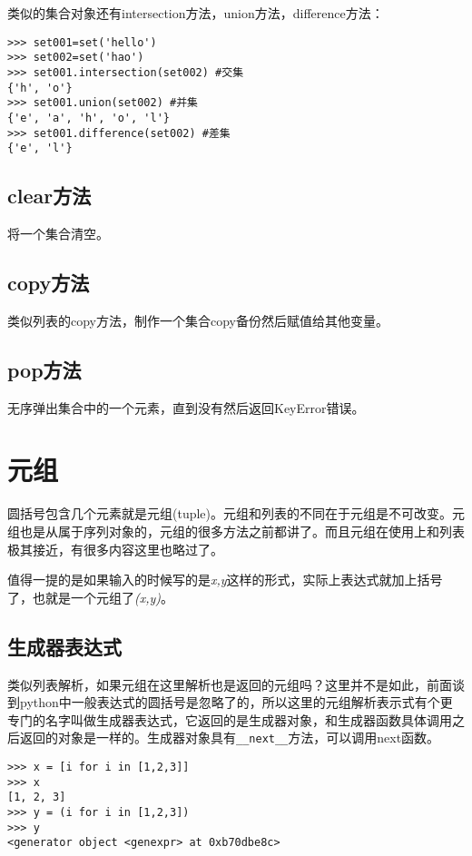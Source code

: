\documentclass[12pt,oneside]{book}
\begin{document}
\begin{common-format}
类似的集合对象还有intersection方法，union方法，difference方法：
\begin{Verbatim}
>>> set001=set('hello')
>>> set002=set('hao')
>>> set001.intersection(set002) #交集
{'h', 'o'}
>>> set001.union(set002) #并集
{'e', 'a', 'h', 'o', 'l'}
>>> set001.difference(set002) #差集
{'e', 'l'}
\end{Verbatim}


\subsection{clear方法}
将一个集合清空。

\subsection{copy方法}
类似列表的copy方法，制作一个集合copy备份然后赋值给其他变量。

\subsection{pop方法}
无序弹出集合中的一个元素，直到没有然后返回KeyError错误。



\section{元组}
圆括号包含几个元素就是元组(tuple)。元组和列表的不同在于元组是不可改变。元组也是从属于序列对象的，元组的很多方法之前都讲了。而且元组在使用上和列表极其接近，有很多内容这里也略过了。

值得一提的是如果输入的时候写的是\textit{x,y}这样的形式，实际上表达式就加上括号了，也就是一个元组了\textit{(x,y)}。

\subsection{生成器表达式}
类似列表解析，如果元组在这里解析也是返回的元组吗？这里并不是如此，前面谈到python中一般表达式的圆括号是忽略了的，所以这里的元组解析表示式有个更专门的名字叫做生成器表达式，它返回的是生成器对象，和生成器函数具体调用之后返回的对象是一样的。生成器对象具有\verb+__next__+方法，可以调用next函数。
\begin{Verbatim}
>>> x = [i for i in [1,2,3]]
>>> x
[1, 2, 3]
>>> y = (i for i in [1,2,3])
>>> y
<generator object <genexpr> at 0xb70dbe8c>
\end{Verbatim}




\end{common-format}
\end{document}
